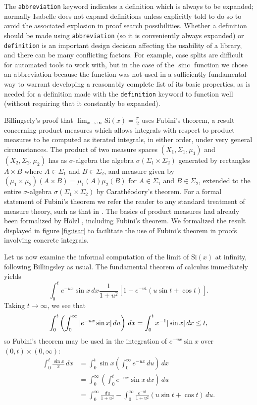 \documentclass[leqno]{article}
\theoremstyle{definition}
\newcommand\sinc{\mathop{\text{sinc}}\nolimits}
\newcommand\Si{\text{Si}}
\begin{document}
\medskip

The \texttt{abbreviation} keyword indicates a definition which is always to be expanded; normally Isabelle does not expand definitions unless explicitly told to do so to avoid the associated explosion in proof search possibilities. Whether a definition should be made using \texttt{abbreviation} (so it is conveniently always expanded) or \texttt{definition} is an important design decision affecting the usability of a library, and there can be many conflicting factors. For example, case splits are difficult for automated tools to work with, but in the case of the $\sinc$ function we chose an abbreviation because the function was not used in a sufficiently fundamental way to warrant developing a reasonably complete list of its basic properties, as is needed for a definition made with the \texttt{definition} keyword to function well (without requiring that it constantly be expanded).

Billingsely's proof that $\lim_{x \rightarrow \infty} \Si(x) = \frac{\pi}{2}$ uses Fubini's theorem, a result concerning product measures which allows integrals with respect to product measures to be computed as iterated integrals, in either order, under very general circumstances. The product of two measure spaces $(X_1, \Sigma_1, \mu_1)$ and $(X_2, \Sigma_2, \mu_2)$ has as $\sigma$-algebra the algebra $\sigma(\Sigma_1 \times \Sigma_2)$ generated by rectangles $A \times B$ where $A \in \Sigma_1$ and $B \in \Sigma_2$, and measure given by $(\mu_1 \times \mu_2)(A \times B) = \mu_1(A)\mu_2(B)$ for $A \in \Sigma_1$ and $B \in \Sigma_2$, extended to the entire $\sigma$-algebra $\sigma(\Sigma_1 \times \Sigma_2)$ by Carath\'eodory's theorem. For a formal statement of Fubini's theorem we refer the reader to any standard treatment of measure theory, such as that in \cite{billingsley}. The basics of product measures had already been formalized by H\"olzl \cite{hoelzl-measure}, including Fubini's theorem. We formalized the result displayed in figure \ref{fig:isar} to facilitate the use of Fubini's theorem in proofs involving concrete integrals.

Let us now examine the informal computation of the limit of $\Si(x)$ at infinity, following Billingsley \cite{billingsley} as usual. The fundamental theorem of calculus immediately yields
\[ \int_0^t e^{-ux} \sin x \, dx \frac{1}{1+u^2}[1 - e^{-ut}(u \sin t + \cos t)]. \]
Taking $t \rightarrow \infty$, we see that
\[ \int_0^t \left( \int_0^\infty |e^{-ux} \sin x| \, du\right) \, dx = \int_0^t x^{-1} |\sin x| \, dx \le t, \]
so Fubini's theorem may be used in the integration of $e^{-ux} \sin x$ over $(0,t) \times (0, \infty)$:
\begin{align*}
\int_0^t \frac{\sin x}{x} \, dx &= \int_0^t \sin x \left(\int_0^\infty e^{-ux} \, du\right) \, dx \\
                                &= \int_0^\infty \left(\int_0^t e^{-ux} \sin x \, dx\right) \, du \\
                                &= \int_0^\infty \frac{du}{1+u^2} - \int_0^\infty \frac{e^{-ut}}{1+u^2} (u \sin t + \cos t) \, du.
\end{align*}
\end{document}
